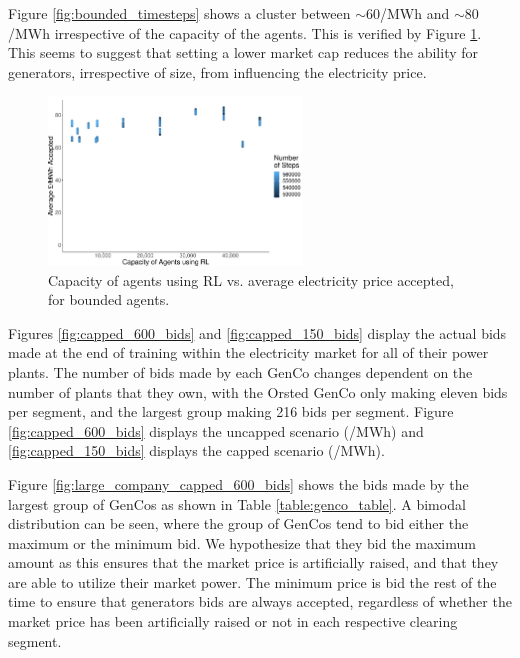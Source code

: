 Figure \ref{fig:bounded_timesteps} shows a cluster between ${\sim}$\textsterling$60$/MWh and ${\sim}$\textsterling$80$/MWh irrespective of the capacity of the agents. This is verified by Figure \ref{fig:bounded_results_scatter}. This seems to suggest that setting a lower market cap reduces the ability for generators, irrespective of size, from influencing the electricity price.






\begin{figure}
	\centering
	\includegraphics[width=0.6\textwidth]{Chapter7/Figures/results/bounded_results_scatter.pdf}
	\caption{Capacity of agents using RL vs. average electricity price accepted, for bounded agents.}
	\label{fig:bounded_results_scatter}
\end{figure}



Figures \ref{fig:capped_600_bids} and \ref{fig:capped_150_bids} display the actual bids made at the end of training within the electricity market for all of their power plants. The number of bids made by each GenCo changes dependent on the number of plants that they own, with the Orsted GenCo only making eleven bids per segment, and the largest group making 216 bids per segment. Figure \ref{fig:capped_600_bids} displays the uncapped scenario (/MWh) and \ref{fig:capped_150_bids} displays the capped scenario (/MWh).

Figure \ref{fig:large_company_capped_600_bids} shows the bids made by the largest group of GenCos as shown in Table \ref{table:genco_table}. A bimodal distribution can be seen, where the group of GenCos tend to bid either the maximum or the minimum bid. We hypothesize that they bid the maximum amount as this ensures that the market price is artificially raised, and that they are able to utilize their market power. The minimum price is bid the rest of the time to ensure that generators bids are always accepted, regardless of whether the market price has been artificially raised or not in each respective clearing segment.

